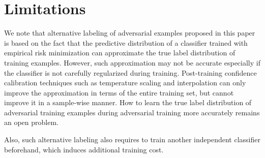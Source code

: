 \section{Limitations}
\label{sect:limitation}
We note that alternative labeling of adversarial examples proposed in this paper is based on the fact that the predictive distribution of a classifier trained with empirical risk minimization can approximate the true label distribution of training examples. However, such approximation may not be accurate especially if the classifier is not carefully regularized during training. Post-training confidence calibration techniques such as temperature scaling and interpolation can only improve the approximation in terms of the entire training set, but cannot improve it in a sample-wise manner. How to learn the true label distribution of adversarial training examples during adversarial training more accurately remains an open problem.

Also, such alternative labeling also requires to train another independent classifier beforehand, which induces additional training cost. 